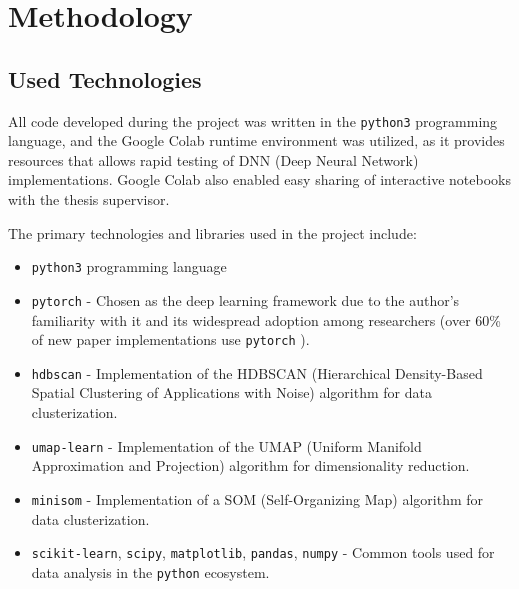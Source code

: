 \section{Methodology}
\subsection{Used Technologies}

All code developed during the project was written in the \texttt{python3} programming language, and the Google Colab runtime environment was utilized, as it provides resources that allows rapid testing of DNN (Deep Neural Network) implementations. 
Google Colab also enabled easy sharing of interactive notebooks with the thesis supervisor.

The primary technologies and libraries used in the project include:
\begin{itemize}
    \item \texttt{python3} programming language
    \item \texttt{pytorch} - Chosen as the deep learning framework due to the author's familiarity with it and its widespread adoption among researchers (over 60\% of new paper implementations use \texttt{pytorch} \cite{papersWithCodeTrends}).
    \item \texttt{hdbscan} - Implementation of the HDBSCAN (Hierarchical Density-Based Spatial Clustering of Applications with Noise) algorithm for data clusterization.
    \item \texttt{umap-learn} - Implementation of the UMAP (Uniform Manifold Approximation and Projection) algorithm for dimensionality reduction.
    \item \texttt{minisom} - Implementation of a SOM (Self-Organizing Map) algorithm for data clusterization.
    \item \texttt{scikit-learn}, \texttt{scipy}, \texttt{matplotlib}, \texttt{pandas}, \texttt{numpy} - Common tools used for data analysis in the \texttt{python} ecosystem.
\end{itemize}
